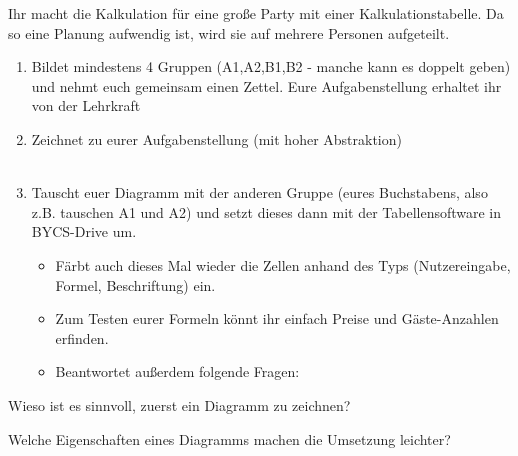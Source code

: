 {
    Ihr macht die Kalkulation für eine große Party mit einer Kalkulationstabelle. Da so eine Planung aufwendig ist, wird sie auf mehrere Personen aufgeteilt.
    \begin{enumerate}
        \item Bildet mindestens 4 Gruppen (A1,A2,B1,B2 - manche kann es doppelt geben) und nehmt euch gemeinsam einen Zettel. Eure Aufgabenstellung erhaltet ihr von der Lehrkraft 
        \item Zeichnet zu eurer Aufgabenstellung  (mit hoher Abstraktion)\\
            \\
        \item Tauscht euer Diagramm mit der anderen Gruppe (eures Buchstabens, also z.B. tauschen A1 und A2) und setzt dieses dann mit der Tabellensoftware in BYCS-Drive um. \begin{itemize}
        \item Färbt auch dieses Mal wieder die Zellen anhand des Typs (Nutzereingabe, Formel, Beschriftung) ein.
            \item Zum Testen eurer Formeln könnt ihr einfach Preise und Gäste-Anzahlen erfinden.
            \item Beantwortet außerdem folgende Fragen:
        \end{itemize}
    \end{enumerate}

    Wieso ist es sinnvoll, zuerst ein Diagramm zu zeichnen?



    Welche Eigenschaften eines Diagramms machen die Umsetzung leichter?

}